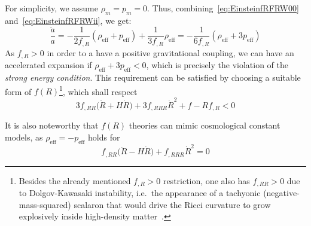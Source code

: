 For simplicity, we assume $\rho_m = p_m = 0$. Thus, combining~\eqref{eq:EinsteinfRFRW00} and~\eqref{eq:EinsteinfRFRWii}, we get:
\begin{equation}
\frac{\ddot{a}}{a} = -\frac{1}{2f_{,R}}\left(\rho_{\mathrm{eff}} + p_{\mathrm{eff}}\right) + \frac{1}{3f_{,R}} \rho_{\mathrm{eff}} = - \frac{1}{6f_{,R}} \left(\rho_{\mathrm{eff}} + 3p_{\mathrm{eff}}\right)
\end{equation}
As $f_{,R} > 0 $ in order to a have a positive gravitational coupling, we can have an accelerated expansion if $\rho_{\mathrm{eff}} + 3p_{\mathrm{eff}} < 0$, which is precisely the violation of the \textit{strong energy condition}. This requirement can be satisfied by choosing a suitable form of $f(R)$\footnote{Besides the already mentioned $f_{,R}>0$ restriction, one also has $f_{,RR}>0$ due to Dolgov-Kawasaki instability, i.e.\ the appearance of a tachyonic (negative-mass-squared) scalaron that would drive the Ricci curvature to grow explosively inside high-density matter~\cite{Dolgov_2003}.}, which shall respect
\begin{equation}
    3 f_{,RR}\bigl(\ddot{R} + H\dot{R}\bigr) + 3 f_{,RRR}\dot{R}^{2} + f - R f_{,R} < 0
\end{equation}

It is also noteworthy that $f(R)$ theories can mimic cosmological constant models, as $\rho_{\mathrm{eff}} = -p_{\mathrm{eff}}$ holds for
\begin{equation}
f_{,RR}\bigl(\ddot{R} - H\dot{R}\bigr) + f_{,RRR}\dot{R}^{2} = 0
\end{equation}
    
